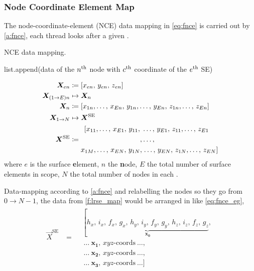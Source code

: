 \subsubsection{Node Coordinate Element Map}
%
The node-coordinate-element (NCE) data mapping in \cref{eq:fnce} is carried out by \cref{a:fnce}, each thread looks after a given .
\begin{algorithm}
	\caption{NCE data mapping.}
	\label{a:fnce}
	\begin{algorithmic}
		\State list.append(data of the $ n\textsuperscript{th}$ node with $ c\textsuperscript{th} $ coordinate of the $ e\textsuperscript{th} $ SE)
		\EndFor
		\EndFor
		\EndFor
	\end{algorithmic}
\end{algorithm}
\begin{subequations}\label{eq:fnce}
	\begin{align}
		\vec{X}_{en}          & \coloneqq \left[x_{en},\, y_{en},\, z_{en}\right]                                                    \\
		\vec{X}_{(1\to E)n}   & \mapsto \vec{X}_{n} \nn
		\vec{X}_{n}           & \coloneqq \left[x_{1n},\ldots,\, x_{En},\, y_{1n},\ldots,\, y_{En},\, z_{1n},\ldots,\, z_{En}\right] \\
		\vec{X}_{1\to N}      & \mapsto \vec{X}^{\textrm{SE}}\nn
		\vec{X}^{\textrm{SE}} & \coloneqq
		\begin{aligned}
			\left[x_{11},\ldots,\, x_{E1},\, y_{11},\right. & \ldots,\, y_{E1},\, z_{11},\ldots,\, z_{E1}              \\
			,                                               & \ldots,                                                  \\
			x_{1M},\ldots,\, x_{EN},\, y_{1N},              & \left.\ldots,\, y_{EN},\, z_{1N},\ldots,\, z_{EN}\right]
		\end{aligned}
	\end{align}
\end{subequations}
where $ e $ is the surface \textbf{e}lement, $ n $ the \textbf{n}ode, $ E $ the total number of surface elements in scope, $ N $ the total number of nodes in each .

Data-mapping according to \cref{a:fnce} and relabelling the nodes so they go from $ 0 \to N-1 $, the data from \cref{f:lrse_map} would be arranged in  like \cref{eq:fnce_eg},
\begin{align}\label{eq:fnce_eg}
	\vec{X}^{\textrm{SE}} & = \begin{aligned}
		 & \left[\underbrace{h_{x},\, i_{x},\, f_{x},\, g_{x},\,
			h_{y},\, i_{y},\, f_{y},\, g_{y},\,
		h_{z},\, i_{z},\, f_{z},\, g_{z}}_{\mathbf{x_{0}}}\right., \\
		 & ~\ldots~\mathbf{x_{1}},\, xyz\textrm{-coords}~\ldots,   \\
		 & ~\ldots~\mathbf{x_{2}},\, xyz\textrm{-coords}~\ldots,   \\
		 & ~\ldots~\mathbf{x_{3}},\, xyz\textrm{-coords}~\ldots]
	\end{aligned}
\end{align}
%
